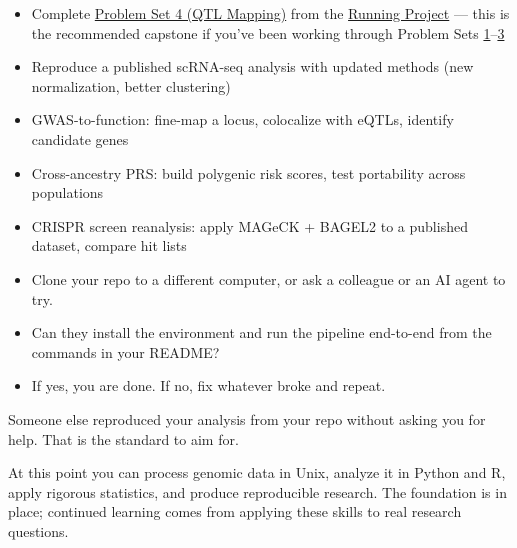 \begin{tipbox}
\begin{itemize}[nosep]
  \item Complete \hyperref[ps:4]{Problem Set 4 (QTL Mapping)} from the \hyperref[chap:running]{Running Project} --- this is the recommended capstone if you've been working through Problem Sets \hyperref[ps:1]{1}--\hyperref[ps:3]{3}
  \item Reproduce a published scRNA-seq analysis with updated methods (new normalization, better clustering)
  \item GWAS-to-function: fine-map a locus, colocalize with eQTLs, identify candidate genes
  \item Cross-ancestry PRS: build polygenic risk scores, test portability across populations
  \item CRISPR screen reanalysis: apply MAGeCK + BAGEL2 to a published dataset, compare hit lists
\end{itemize}
\end{tipbox}

\begin{itemize}[nosep]
  \item Clone your repo to a different computer, or ask a colleague or an AI agent to try.
  \item Can they install the environment and run the pipeline end-to-end from the commands in your README?
  \item If yes, you are done. If no, fix whatever broke and repeat.
\end{itemize}
\begin{winbox}[Checkpoint]
Someone else reproduced your analysis from your repo without asking you for help. That is the standard to aim for.
\end{winbox}

\begin{restbox}
At this point you can process genomic data in Unix, analyze it in Python and R, apply rigorous statistics, and produce reproducible research. The foundation is in place; continued learning comes from applying these skills to real research questions.
\end{restbox}
